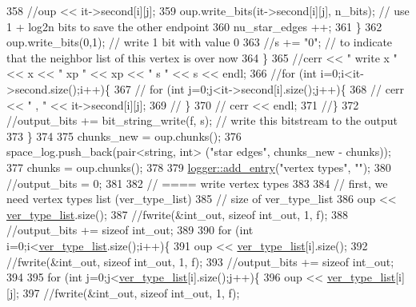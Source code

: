 \begin{DoxyCode}
358         \textcolor{comment}{//oup <<  it->second[i][j];}
359         oup.write\_bits(it->second[i][j], n\_bits); \textcolor{comment}{// use 1 + log2n bits to save the other endpoint}
360         nu\_star\_edges ++;
361       \}
362       oup.write\_bits(0,1); \textcolor{comment}{// write 1 bit with value 0 }
363       \textcolor{comment}{//s += "0"; // to indicate that the neighbor list of this vertex is over now}
364     \}
365     \textcolor{comment}{//cerr << " write  x " << x << " xp " << xp << " s " << s << endl;}
366     \textcolor{comment}{//for (int i=0;i<it->second.size();i++)\{}
367     \textcolor{comment}{//  for (int j=0;j<it->second[i].size();j++)\{}
368     \textcolor{comment}{//    cerr << " , " << it->second[i][j];}
369     \textcolor{comment}{//  \}}
370     \textcolor{comment}{//  cerr << endl;}
371     \textcolor{comment}{//\}}
372     \textcolor{comment}{//output\_bits += bit\_string\_write(f, s); // write this bitstream to the output}
373   \}
374   
375   chunks\_new = oup.chunks();
376   space\_log.push\_back(pair<string, int> (\textcolor{stringliteral}{"star edges"}, chunks\_new - chunks));
377   chunks = oup.chunks();
378 
379   \hyperlink{classlogger_a710163deb17bc81f70d53d285b8ac9ac}{logger::add\_entry}(\textcolor{stringliteral}{"vertex types"}, \textcolor{stringliteral}{""});
380   \textcolor{comment}{//output\_bits = 0;}
381   
382   \textcolor{comment}{// ==== write vertex types}
383 
384   \textcolor{comment}{// first, we need vertex types list (ver\_type\_list)}
385   \textcolor{comment}{// size of ver\_type\_list}
386   oup <<  \hyperlink{classmarked__graph__compressed_af2e3e55223d436628a02758dfae88493}{ver\_type\_list}.size();
387   \textcolor{comment}{//fwrite(&int\_out, sizeof int\_out, 1, f);}
388   \textcolor{comment}{//output\_bits += sizeof int\_out;}
389 
390   \textcolor{keywordflow}{for} (\textcolor{keywordtype}{int} i=0;i<\hyperlink{classmarked__graph__compressed_af2e3e55223d436628a02758dfae88493}{ver\_type\_list}.size();i++)\{
391     oup << \hyperlink{classmarked__graph__compressed_af2e3e55223d436628a02758dfae88493}{ver\_type\_list}[i].size();
392     \textcolor{comment}{//fwrite(&int\_out, sizeof int\_out, 1, f);}
393     \textcolor{comment}{//output\_bits += sizeof int\_out;}
394 
395     \textcolor{keywordflow}{for} (\textcolor{keywordtype}{int} j=0;j<\hyperlink{classmarked__graph__compressed_af2e3e55223d436628a02758dfae88493}{ver\_type\_list}[i].size();j++)\{
396       oup << \hyperlink{classmarked__graph__compressed_af2e3e55223d436628a02758dfae88493}{ver\_type\_list}[i][j];
397       \textcolor{comment}{//fwrite(&int\_out, sizeof int\_out, 1, f);}

\end{DoxyCode}
